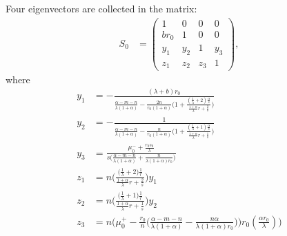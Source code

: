 \documentclass[a4paper,11pt]{article}
\begin{document}
Four eigenvectors are collected in the matrix:
\begin{align*}
 S_0&=
 \begin{pmatrix}
    1 & 0 & 0 & 0\\
    br_0 & 1 & 0 & 0\\
    y_1 & y_2 & 1 & y_3\\
    z_1 & z_2 & z_3 &1
 \end{pmatrix},
\end{align*}
where
\begin{align*}
 y_1&=-\frac{(\lambda+b)r_0}{\frac{\alpha-m-n}{\lambda(1+\alpha)} - \frac{2n}{r_0(1+\alpha)}\Big(1 + \frac{(\frac{1}{\lambda}+2)\frac{\alpha}{s}}{ \frac{1+\alpha}{\lambda}r + \frac{2}{s} }\Big) }\\
 y_2&=-\frac{1}{\frac{\alpha-m-n}{\lambda(1+\alpha)} - \frac{n}{r_0(1+\alpha)}\Big(1 + \frac{(\frac{1}{\lambda}+1)\frac{\alpha}{s}}{ \frac{1+\alpha}{\lambda}r + \frac{1}{s} }\Big) }\\
 y_3&=\frac{\mu_0^- +\frac{r_0s_0}{\lambda}}{s\Big(\frac{\alpha-m-n}{\lambda(1+\alpha)} + \frac{n}{\lambda(1+\alpha)r_0}\Big)}\\
 z_1&=n\bigg(\frac{\big(\frac{1}{\lambda}+2\big)\frac{1}{r}}{ \frac{1+\alpha}{\lambda}r + \frac{2}{s} }\bigg)y_1 \\
 z_2&=n\bigg(\frac{\big(\frac{1}{\lambda}+1\big)\frac{1}{r}}{ \frac{1+\alpha}{\lambda}r + \frac{1}{s} }\bigg)y_2 \\
 z_3&=n\bigg(\mu_0^+-\frac{r_0}{n}\Big(\frac{\alpha-m-n}{\lambda(1+\alpha)} - \frac{n\alpha}{\lambda(1+\alpha)r_0}\Big)\bigg)r_0(\frac{\alpha r_0}{\lambda})\bigg)
\end{align*}
\end{document}
